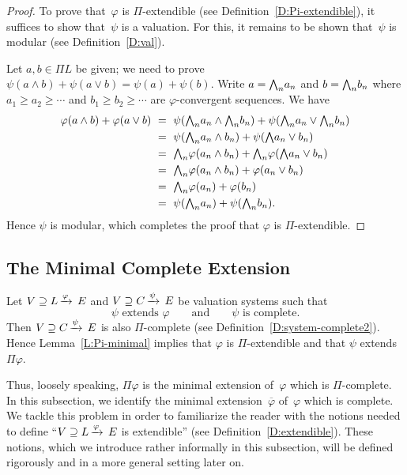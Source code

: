 \documentclass[main.tex]{subfiles}
\begin{document}
\begin{proof}
To prove that~$\varphi$ is $\Pi$-extendible
(see Definition~\ref{D:Pi-extendible}),
it suffices to show that~$\psi$ is a valuation.
For this,
it remains to be shown that~$\psi$ is modular
(see Definition~\ref{D:val}).

Let $a,b\in \Pi L$ be given; 
we need to prove $\psi(a\wedge b) + \psi(a\vee b)= \psi(a)+\psi(b)$.
Write  $a = \textstyle{\bigwedge}_n a_n$ and $b = \textstyle{\bigwedge}_n b_n$
where 
 $a_1 \geq a_2 \geq \dotsb$ and $b_1 \geq b_2 \geq \dotsb$
are $\varphi$-convergent sequences.
We have
\begin{alignat*}{3}
\varphi(a\wedge b) + \varphi(a \vee b) 
\ &=\ \psi(\textstyle{\bigwedge}_n a_n \wedge \textstyle{\bigwedge}_n b_n) + \psi(\textstyle{\bigwedge}_n a_n \vee \textstyle{\bigwedge}_n b_n) \\
\ &=\ \psi(\textstyle{\bigwedge}_n a_n \wedge b_n) + \psi(\textstyle{\bigwedge} a_n \vee b_n) \\
  &=\ \textstyle{\bigwedge}_n \varphi(a_n \wedge b_n) + \textstyle{\bigwedge}_n \varphi(\textstyle{\bigwedge} a_n \vee b_n) \\
  &=\ \textstyle{\bigwedge}_n \varphi(a_n \wedge b_n) + \varphi(a_n \vee b_n) \\
  &=\ \textstyle{\bigwedge}_n \varphi(a_n) + \varphi(b_n) \\
  &=\ \psi(\textstyle{\bigwedge}_n a_n) + \psi(\textstyle{\bigwedge}_n b_n).
\end{alignat*}
Hence $\psi$ is modular, which completes the proof
that $\varphi$ is $\Pi$-extendible.
\end{proof}
%
%
\subsection{The Minimal Complete Extension} $\,$\\
\label{SS:hierarchy}
Let $V \supseteq L\,\smash{\xrightarrow{\varphi}\,E}$ 
and $V \supseteq C\,\smash{\xrightarrow{\psi}\,E}$
be valuation systems
such that 
\begin{equation*}
\text{$\psi$ extends~$\varphi$}
\qquad\text{and}\qquad
\text{$\psi$ is complete.}
\end{equation*}
Then $V \supseteq C\,\smash{\xrightarrow{\psi}\,E}$ is also $\Pi$-complete
(see Definition~\ref{D:system-complete2}).
Hence Lemma~\ref{L:Pi-minimal}
implies that $\varphi$ is $\Pi$-extendible 
and that $\psi$ extends  $\Pi \varphi$.

Thus, loosely speaking, $\Pi\varphi$ is the minimal extension of~$\varphi$
which is $\Pi$-complete.
In this subsection,
we identify the minimal extension~$\overline \varphi$ of~$\varphi$
which is complete.
We tackle this problem
in order to familiarize
the reader with the notions needed to define
``$V \supseteq L\,\smash{\xrightarrow{\varphi}\,E}$ is extendible''
(see Definition~\ref{D:extendible}).
These notions, which we introduce
 rather informally in this subsection,
will be defined rigorously and in a more general setting later on.
\end{document}
